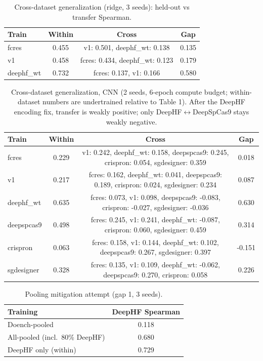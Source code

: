 \begin{table}[h]\centering\caption{Cross-dataset generalization (ridge, 3 seeds): held-out vs transfer Spearman.}\label{tab:crossdata}\begin{tabular}{lccc}\hline Train & Within & Cross & Gap \\\hline
fcres & 0.455 & v1: 0.501, deephf\_wt: 0.138 & 0.135 \\
v1 & 0.458 & fcres: 0.434, deephf\_wt: 0.123 & 0.179 \\
deephf\_wt & 0.732 & fcres: 0.137, v1: 0.166 & 0.580 \\
\hline\end{tabular}\end{table}
\begin{table}[h]\centering\caption{Cross-dataset generalization, CNN (2 seeds, 6-epoch compute budget; within-dataset numbers are undertrained relative to Table 1). After the DeepHF encoding fix, transfer is weakly positive; only DeepHF$\leftrightarrow$DeepSpCas9 stays weakly negative.}\label{tab:crosscnn}\begin{tabular}{lccc}\hline Train & Within & Cross & Gap \\\hline
fcres & 0.229 & v1: 0.242, deephf\_wt: 0.158, deepspcas9: 0.245, crispron: 0.054, sgdesigner: 0.359 & 0.018 \\
v1 & 0.217 & fcres: 0.162, deephf\_wt: 0.041, deepspcas9: 0.189, crispron: 0.024, sgdesigner: 0.234 & 0.087 \\
deephf\_wt & 0.635 & fcres: 0.073, v1: 0.098, deepspcas9: -0.083, crispron: -0.027, sgdesigner: -0.036 & 0.630 \\
deepspcas9 & 0.498 & fcres: 0.245, v1: 0.241, deephf\_wt: -0.087, crispron: 0.060, sgdesigner: 0.459 & 0.314 \\
crispron & 0.063 & fcres: 0.158, v1: 0.144, deephf\_wt: 0.102, deepspcas9: 0.267, sgdesigner: 0.397 & -0.151 \\
sgdesigner & 0.328 & fcres: 0.135, v1: 0.109, deephf\_wt: -0.062, deepspcas9: 0.270, crispron: 0.058 & 0.226 \\
\hline\end{tabular}\end{table}
\begin{table}[h]\centering\caption{Pooling mitigation attempt (gap 1, 3 seeds).}\label{tab:pooled}\begin{tabular}{lc}\hline Training & DeepHF Spearman \\\hline
Doench-pooled & 0.118 \\
All-pooled (incl.\ 80\% DeepHF) & 0.680 \\
DeepHF only (within) & 0.729 \\
\hline\end{tabular}\end{table}
